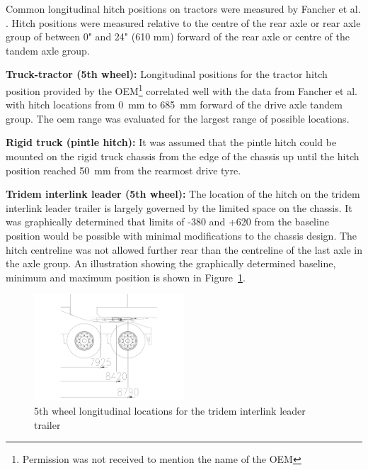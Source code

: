 Common longitudinal hitch positions on tractors were measured by Fancher et al. \cite{Fancher1986}. Hitch positions were measured relative to the centre of the rear axle or rear axle group of between 0" and 24" (610 mm) forward of the rear axle or centre of the tandem axle group.

\textbf{Truck-tractor (5th wheel):}
Longitudinal positions for the tractor hitch position provided by the OEM\footnote{Permission was not received to mention the name of the OEM} correlated well with the data from Fancher et al. with hitch locations from 0~mm to 685~mm forward of the drive axle tandem group. The \gls{oem} range was evaluated for the largest range of possible locations.

\textbf{Rigid truck (pintle hitch):}
It was assumed that the pintle hitch could be mounted on the rigid truck chassis from the edge of the chassis up until the hitch position reached 50~mm from the rearmost drive tyre.

\textbf{Tridem interlink leader (5th wheel):}
The location of the hitch on the tridem interlink leader trailer is largely governed by the limited space on the chassis. It was graphically determined that limits of -380 and +620 from the baseline position would be possible with minimal modifications to the chassis design. The hitch centreline was not allowed further rear than the centreline of the last axle in the axle group. An illustration showing the graphically determined baseline, minimum and maximum position is shown in Figure~\ref{figure:b-double-5th-wheel-hitch-locations}.

\begin{figure}[H]
	\centering
	\includegraphics[width=0.5\textwidth]{fig/baseline_b-double_hitch-locations}
	\caption{5th wheel longitudinal locations for the tridem interlink leader trailer}
	\label{figure:b-double-5th-wheel-hitch-locations}
\end{figure}

